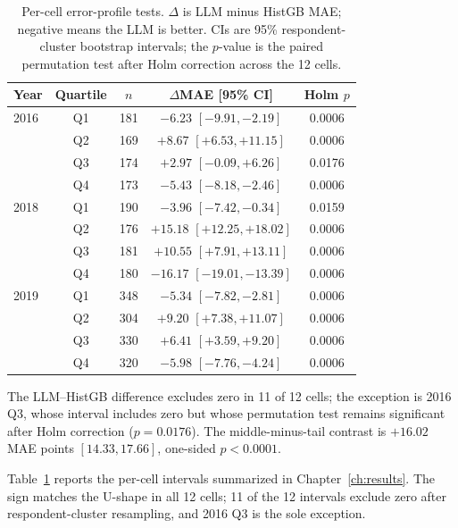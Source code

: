 \begin{table}[h]
\centering
\small
\caption{Per-cell error-profile tests. $\Delta$ is LLM minus HistGB MAE;
negative means the LLM is better. CIs are 95\% respondent-cluster bootstrap
intervals; the $p$-value is the paired permutation test after Holm correction
across the 12 cells.}
\label{tab:profile_tests}
\begin{tabular}{lcccc}
\toprule
Year & Quartile & $n$ & $\Delta$MAE [95\% CI] & Holm $p$ \\
\midrule
2016 & Q1 & 181 & $-6.23$ $[-9.91, -2.19]$ & 0.0006 \\
     & Q2 & 169 & $+8.67$ $[+6.53, +11.15]$ & 0.0006 \\
     & Q3 & 174 & $+2.97$ $[-0.09, +6.26]$ & 0.0176 \\
     & Q4 & 173 & $-5.43$ $[-8.18, -2.46]$ & 0.0006 \\
\midrule
2018 & Q1 & 190 & $-3.96$ $[-7.42, -0.34]$ & 0.0159 \\
     & Q2 & 176 & $+15.18$ $[+12.25, +18.02]$ & 0.0006 \\
     & Q3 & 181 & $+10.55$ $[+7.91, +13.11]$ & 0.0006 \\
     & Q4 & 180 & $-16.17$ $[-19.01, -13.39]$ & 0.0006 \\
\midrule
2019 & Q1 & 348 & $-5.34$ $[-7.82, -2.81]$ & 0.0006 \\
     & Q2 & 304 & $+9.20$ $[+7.38, +11.07]$ & 0.0006 \\
     & Q3 & 330 & $+6.41$ $[+3.59, +9.20]$ & 0.0006 \\
     & Q4 & 320 & $-5.98$ $[-7.76, -4.24]$ & 0.0006 \\
\bottomrule
\end{tabular}
\par\smallskip\footnotesize
The LLM--HistGB difference excludes zero in 11 of 12 cells; the exception is
2016 Q3, whose interval includes zero but whose permutation test remains
significant after Holm correction ($p=0.0176$). The middle-minus-tail contrast
is $+16.02$ MAE points $[14.33, 17.66]$, one-sided $p<0.0001$.
\end{table}

Table~\ref{tab:profile_tests} reports the per-cell intervals summarized in
Chapter~\ref{ch:results}. The sign matches the U-shape in all 12 cells; 11 of
the 12 intervals exclude zero after respondent-cluster resampling, and 2016 Q3
is the sole exception.
